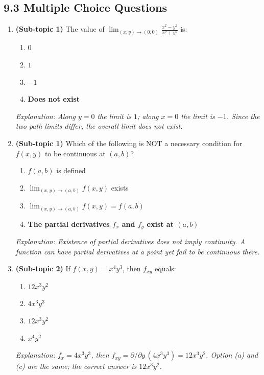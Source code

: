 \documentclass[12pt,a4paper]{article}
\begin{document}
\subsection*{9.3 Multiple Choice Questions}

\begin{enumerate}
  \item \textbf{(Sub-topic 1)} The value of \(\displaystyle\lim_{(x,y)\to(0,0)} \frac{x^2 - y^2}{x^2 + y^2}\) is:
  \begin{enumerate}[label=(\alph*)]
    \item \(0\)
    \item \(1\)
    \item \(-1\)
    \item \textbf{Does not exist}
  \end{enumerate}
  \textit{Explanation: Along \(y=0\) the limit is \(1\); along \(x=0\) the limit is \(-1\). Since the two path limits differ, the overall limit does not exist.}

  \item \textbf{(Sub-topic 1)} Which of the following is NOT a necessary condition for \(f(x,y)\) to be continuous at \((a,b)\)?
  \begin{enumerate}[label=(\alph*)]
    \item \(f(a,b)\) is defined
    \item \(\lim_{(x,y)\to(a,b)} f(x,y)\) exists
    \item \(\lim_{(x,y)\to(a,b)} f(x,y) = f(a,b)\)
    \item \textbf{The partial derivatives \(f_x\) and \(f_y\) exist at \((a,b)\)}
  \end{enumerate}
  \textit{Explanation: Existence of partial derivatives does not imply continuity. A function can have partial derivatives at a point yet fail to be continuous there.}

  \item \textbf{(Sub-topic 2)} If \(f(x,y) = x^4 y^3\), then \(f_{xy}\) equals:
  \begin{enumerate}[label=(\alph*)]
    \item \(12x^3 y^2\)
    \item \(4x^3 y^3\)
    \item \textbf{\(12x^3 y^2\)}
    \item \(x^4 y^2\)
  \end{enumerate}
  \textit{Explanation: \(f_x = 4x^3 y^3\), then \(f_{xy} = \partial/\partial y\,(4x^3 y^3) = 12x^3 y^2\). Option (a) and (c) are the same; the correct answer is \(12x^3 y^2\).}


\end{enumerate}
\end{document}
